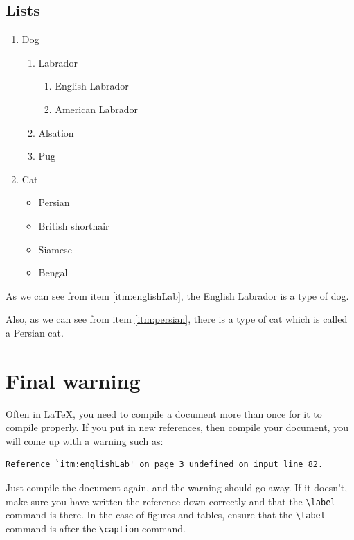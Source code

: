 \documentclass[a4paper,12pt]{article}
\begin{document}
\subsection{Lists}
\begin{enumerate}
  \item Dog
    \begin{enumerate}
      \item Labrador
        \begin{enumerate}
          \item English Labrador
            \label{itm:englishLab}
          \item American Labrador
        \end{enumerate}
      \item Alsation
      \item Pug
    \end{enumerate}
  \item Cat
    \begin{itemize}
      \item Persian
        \label{itm:persian}
      \item British shorthair
      \item Siamese
      \item Bengal
    \end{itemize}
\end{enumerate}

As we can see from item \ref{itm:englishLab}, the English Labrador is a type of dog.

Also, as we can see from item \ref{itm:persian}, there is a type of cat which is called a Persian cat.

\section{Final warning}
Often in \LaTeX, you need to compile a document more than once for it to compile properly. If you put in new references, then compile your document, you will come up with a warning such as:

\begin{verbatim}
Reference `itm:englishLab' on page 3 undefined on input line 82.
\end{verbatim}

Just compile the document again, and the warning should go away. If it doesn't, make sure you have written the reference down correctly and that the \verb|\label| command is there. In the case of figures and tables, ensure that the \verb|\label| command is after the \verb|\caption| command.
\end{document}
